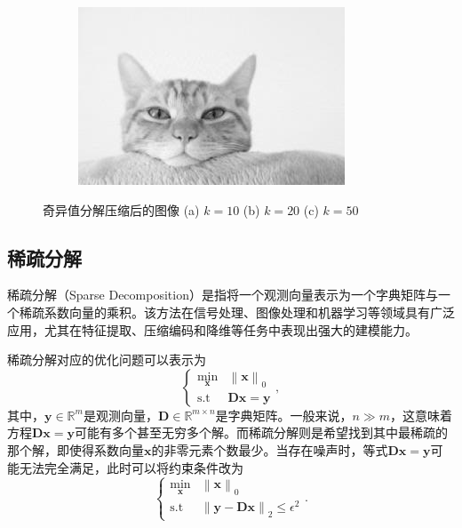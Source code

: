 \begin{solution}
\begin{figure}[htb!]
\begin{subfigure}{.3\textwidth}
            \includegraphics[width=.9\textwidth]{./img/matrix/cat_approx3.jpg}
            \caption{}
            \label{fig_compressed_images_3}
        \end{subfigure}
        \caption{奇异值分解压缩后的图像 (a) \( k = 10 \) (b) \( k = 20 \) (c) \( k = 50 \)}
        \label{fig_compressed_images}
    \end{figure}
\end{solution}

\subsection{稀疏分解}
稀疏分解（Sparse Decomposition）是指将一个观测向量表示为一个字典矩阵与一个稀疏系数向量的乘积。该方法在信号处理、图像处理和机器学习等领域具有广泛应用，尤其在特征提取、压缩编码和降维等任务中表现出强大的建模能力。

稀疏分解对应的优化问题可以表示为
\begin{equation}
    \begin{cases}
        \min_{\bm{x}} & \left\| \bm{x} \right\|_0  \\
        \text{s.t}    & \mathbf{D} \bm{x} = \bm{y}
    \end{cases},
    \label{eq:sparse-decomposition}
\end{equation}
其中，\( \bm{y} \in \mathbb{R}^m \)是观测向量，\( \mathbf{D} \in \mathbb{R}^{m \times n} \)是字典矩阵。一般来说，\( n \gg m \)，这意味着方程\( \mathbf{D} \bm{x} = \bm{y} \)可能有多个甚至无穷多个解。而稀疏分解则是希望找到其中最稀疏的那个解，即使得系数向量\( \bm{x} \)的非零元素个数最少。当存在噪声时，等式\( \mathbf{D} \bm{x} = \bm{y} \)可能无法完全满足，此时可以将约束条件改为
\begin{equation}
    \begin{cases}
        \min_{\bm{x}} & \left\| \bm{x} \right\|_0                                     \\
        \text{s.t}    & \left\| \bm{y} - \mathbf{D} \bm{x} \right\|_2 \leq \epsilon^2
    \end{cases}.
    \label{eq:sparse-decomposition-noisy}
\end{equation}

